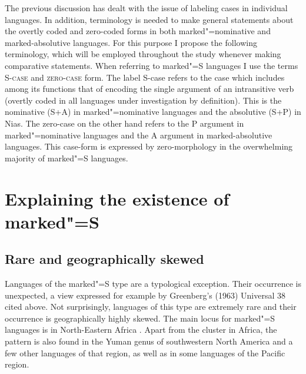 The previous discussion has dealt with the issue of labeling cases in individual languages.
In addition, terminology is needed to make general statements about the overtly coded and zero-coded forms in both marked"=nominative and marked-absolutive languages. 
For this purpose I propose the following terminology, which will be employed throughout the study whenever making comparative statements.  
When referring to marked"=S languages I use the terms \textsc{S-case} and \textsc{zero-case} form. 
The label S-case refers to the case which includes among its functions that of encoding the single argument of an intransitive verb (overtly coded in all languages under investigation by definition). 
This is the nominative (S+A) in marked"=nominative languages and the absolutive (S+P) in Nias. 
The zero-case on the other hand refers to the P argument in marked"=nominative languages and the A argument in marked-absolutive languages. 
This case-form is expressed by zero-morphology in the overwhelming majority of marked"=S languages.  
      




\section[Explaining the existence of marked"=S]{Explaining the existence of marked"=S}\label{explain}

\subsection{Rare and geographically skewed}
Languages of the marked"=S type are a typological exception. 
Their occurrence is unexpected, a view expressed for example by Greenberg's (1963) Universal 38 cited above. Not surprisingly, languages of this type are extremely rare and their occurrence is geographically highly skewed. 
The main locus for marked"=S languages is in North-Eastern Africa \citep[138]{Koenig:2008}. 
Apart from the cluster in Africa, the pattern is also found in the Yuman genus of southwestern North America and a few other languages of that region, as well as in some languages of the Pacific region. 

